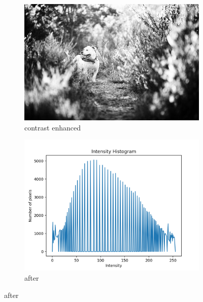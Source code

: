 \documentclass[11pt,a4paper]{article}
\begin{document}
\begin{figure}[h]
	\ContinuedFloat
	\centering
	\begin{subfigure}[h]{0.7\textwidth}
		\includegraphics[width=\textwidth]{figs/lc1_ce}
		\caption{contrast enhanced}
		\label{fig:lc1_after}
	\end{subfigure}
	
	\begin{subfigure}[h]{0.75\textwidth}
		\includegraphics[width=\textwidth]{figs/lc1_hist_aft}
		\caption{after}
		\label{fig:hist_aft_1}
	\end{subfigure}
\end{figure}

\clearpage
\end{document}
